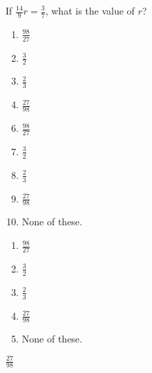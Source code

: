 
If $\frac{14}{9}r=\frac{3}{7}$, what is the value of $r$?


\ifsat
	\begin{enumerate}[label=\Alph*)]
		\item $\frac{98}{27} $ 
		\item $\frac{3}{2} $ 
		\item $\frac{2}{3} $ 
		\item $\frac{27}{98} $ %
	\end{enumerate}
\else
\fi

\ifacteven
	\begin{enumerate}[label=\textbf{\Alph*.},itemsep=\fill,align=left]
		\setcounter{enumii}{5}
		\item $\frac{98}{27} $ 
		\item $\frac{3}{2} $ 
		\item $\frac{2}{3} $ 
		\addtocounter{enumii}{1}
		\item $\frac{27}{98} $ %
		\item None of these. 
	\end{enumerate}
\else
\fi

\ifactodd
	\begin{enumerate}[label=\textbf{\Alph*.},itemsep=\fill,align=left]
		\item $\frac{98}{27} $ 
		\item $\frac{3}{2} $ 
		\item $\frac{2}{3} $ 
		\item $\frac{27}{98} $ %
		\item None of these. 
	\end{enumerate}
\else
\fi

\ifgridin
 $\frac{27}{98} $ %

\else
\fi

